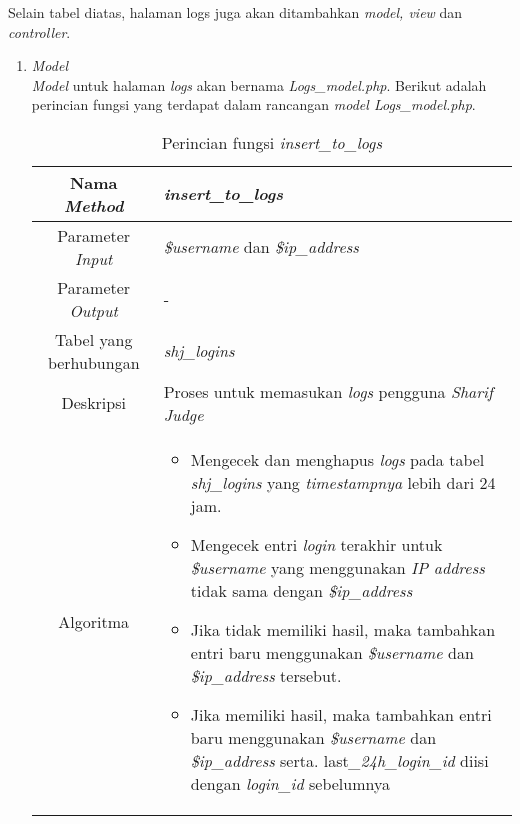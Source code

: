Selain tabel diatas, halaman logs juga akan ditambahkan \textit{model, view} dan \textit{controller}.
\begin{enumerate}
	\item \textit{Model} \\
	\textit{Model} untuk halaman \textit{logs} akan bernama \textit{Logs\_model.php}. Berikut adalah perincian fungsi yang terdapat dalam rancangan \textit{model Logs\_model.php}.
	\begin{table}[H]
		\caption{Perincian fungsi \textit{insert\_to\_logs}}
		\begin{tabular}{|c|p{11cm}|}
			\hline
			Nama \textit{Method} 	& 	\textit{insert\_to\_logs} 	\\
			\hline
			Parameter \textit{Input} & \textit{\$username} dan \textit{\$ip\_address} \\
			\hline
			Parameter \textit{Output} & -\\
			\hline
			Tabel yang berhubungan & \textit{shj\_logins} \\
			\hline
			Deskripsi	& Proses untuk memasukan \textit{logs} pengguna \textit{Sharif Judge} \\
			\hline
			Algoritma	& \begin{itemize}
				\item Mengecek dan menghapus \textit{logs} pada tabel \textit{shj\_logins} yang \textit{timestampnya} lebih dari 24 jam.
				\item Mengecek entri \textit{login} terakhir untuk \textit{\$username} yang  menggunakan \textit{IP address} tidak sama dengan \textit{\$ip\_address}
				\item Jika tidak memiliki hasil, maka tambahkan entri baru menggunakan \textit{\$username} dan \textit{\$ip\_address} tersebut.
				\item Jika memiliki hasil,  maka tambahkan entri baru menggunakan \textit{\$username} dan \textit{\$ip\_address} serta. last\textit{\_24h\_login\_id} diisi dengan \textit{login\_id} sebelumnya
			\end{itemize} \\
			\hline
		\end{tabular}
	\end{table}


\end{enumerate}
